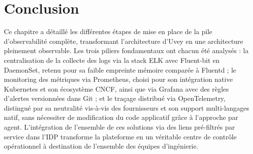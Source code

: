 \section*{Conclusion}

\noindent Ce chapitre a détaillé les différentes étapes de mise en place de la pile d'observabilité complète, transformant l'architecture d'Uvey en une architecture pleinement observable. Les trois piliers fondamentaux ont chacun été analysés : la centralisation de la collecte des logs via la stack ELK avec Fluent-bit en DaemonSet, retenu pour sa faible empreinte mémoire comparée à Fluentd ; le monitoring des métriques via Prometheus, choisi pour son intégration native Kubernetes et son écosystème \ac{CNCF}, ainsi que via Grafana avec des règles d'alertes versionnées dans Git ; et le traçage distribué via OpenTelemetry, distingué par sa neutralité vis-à-vis des fournisseurs et son support multi-langages natif, sans nécessiter de modification du code applicatif grâce à l'approche par agent. L'intégration de l'ensemble de ces solutions via des liens pré-filtrés par service dans l'\ac{IDP} transforme la plateforme en un véritable centre de contrôle opérationnel à destination de l'ensemble des équipes d'ingénierie.